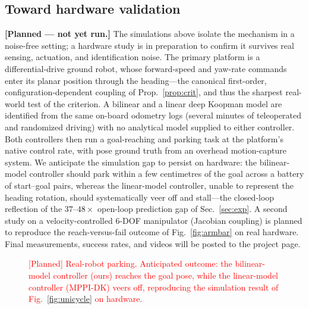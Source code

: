 \documentclass[lettersize,journal]{IEEEtran}
\theoremstyle{remark}
\newcommand{\figph}[2]{\fcolorbox{red}{gray!8}{\parbox[c][#1][c]{0.96\linewidth}{\centering
\color{red!65!black}\small\textbf{[figure placeholder]}\\[3pt] #2}}}
\begin{document}
\subsection{Toward hardware validation}
{\color{red}
\textbf{[Planned --- not yet run.]}
The simulations above isolate the mechanism in a noise-free setting; a hardware study is in preparation to confirm it survives real sensing, actuation, and identification noise.
The primary platform is a differential-drive ground robot, whose forward-speed and yaw-rate commands enter its planar position through the heading---the canonical first-order, configuration-dependent coupling of Prop.~\ref{prop:crit}, and thus the sharpest real-world test of the criterion.
A bilinear and a linear deep Koopman model are identified from the same on-board odometry logs (several minutes of teleoperated and randomized driving) with no analytical model supplied to either controller.
Both controllers then run a goal-reaching and parking task at the platform's native control rate, with pose ground truth from an overhead motion-capture system.
We anticipate the simulation gap to persist on hardware: the bilinear-model controller should park within a few centimetres of the goal across a battery of start--goal pairs, whereas the linear-model controller, unable to represent the heading rotation, should systematically veer off and stall---the closed-loop reflection of the $37$--$48\times$ open-loop prediction gap of Sec.~\ref{sec:exp}.
A second study on a velocity-controlled $6$-DOF manipulator (Jacobian coupling) is planned to reproduce the reach-versus-fail outcome of Fig.~\ref{fig:armbar} on real hardware.
Final measurements, success rates, and videos will be posted to the project page.
}

\begin{figure}[t]\centering
\figph{3.6cm}{\textcolor{red}{Differential-drive ground robot parking under bilinear vs.\ linear Koopman MPPI, with motion-capture ground truth. Hardware photograph and overlaid closed-loop trajectories to be added once the study is run.}}
\caption{\textcolor{red}{[Planned] Real-robot parking. Anticipated outcome: the bilinear-model controller (ours) reaches the goal pose, while the linear-model controller (MPPI-DK) veers off, reproducing the simulation result of Fig.~\ref{fig:unicycle} on hardware.}}
\label{fig:hw}
\end{figure}

\end{document}
